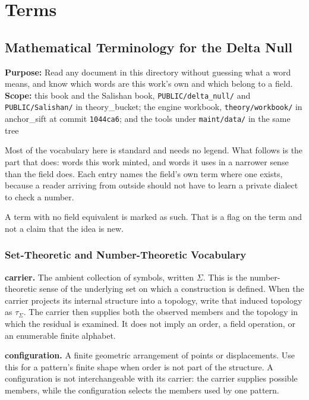\chapter{Terms}

\section{Mathematical Terminology for the Delta Null}

\textbf{Purpose:} Read any document in this directory without guessing what a word means, and know which words are this work's own and which belong to a field. \textbf{Scope:} this book and the Salishan book, \texttt{PUBLIC/\allowbreak{}delta\_\allowbreak{}null/\allowbreak{}} and \texttt{PUBLIC/\allowbreak{}Salishan/\allowbreak{}} in theory\_bucket; the engine workbook, \texttt{theory/\allowbreak{}workbook/\allowbreak{}} in anchor\_sift at commit \texttt{1044ca6}; and the tools under \texttt{maint/\allowbreak{}data/\allowbreak{}} in the same tree

Most of the vocabulary here is standard and needs no legend. What follows is the part that does: words this work minted, and words it uses in a narrower sense than the field does. Each entry names the field's own term where one exists, because a reader arriving from outside should not have to learn a private dialect to check a number.

A term with no field equivalent is marked as such. That is a flag on the term and not a claim that the idea is new.

\subsection{Set-Theoretic and Number-Theoretic Vocabulary}

\noindent\textbf{carrier.} The ambient collection of symbols, written \(\Sigma\). This is the number-theoretic sense of the underlying set on which a construction is defined. When the carrier projects its internal structure into a topology, write that induced topology as \(\tau_\Sigma\). The carrier then supplies both the observed members and the topology in which the residual is examined. It does not imply an order, a field operation, or an enumerable finite alphabet.

\noindent\textbf{configuration.} A finite geometric arrangement of points or displacements. Use this for a pattern's finite shape when order is not part of the structure. A configuration is not interchangeable with its carrier: the carrier supplies possible members, while the configuration selects the members used by one pattern.

